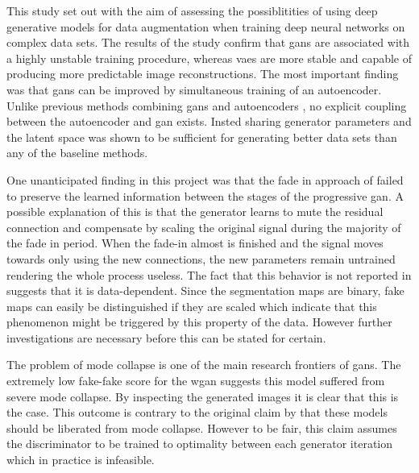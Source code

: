 This study set out with the aim of assessing the possiblitities of using deep generative models for data augmentation when training deep neural networks on complex data sets. The results of the study confirm that \acrshort{gans} are associated with a highly unstable training procedure, whereas \acrshort{vaes} are more stable and capable of producing more predictable image reconstructions. The most important finding was that \acrshort{gans} can be improved by simultaneous training of an autoencoder. Unlike previous methods combining \acrshort{gans} and autoencoders \parencite{LarsenSW15autoencodingbeyond, nguyen2016plug, donahue2016adversarial, ulyanovVL17adversarial}, no explicit coupling between the autoencoder and \acrshort{gan} exists. Insted sharing generator parameters and the latent space was shown to be sufficient for generating better data sets than any of the baseline methods.

One unanticipated finding in this project was that the fade in approach of \textcite{karras2017progressive} failed to preserve the learned information between the stages of the progressive \acrshort{gan}. A possible explanation of this is that the generator learns to mute the residual connection and compensate by scaling the original signal during the majority of the fade in period. When the fade-in almost is finished and the signal moves towards only using the new connections, the new parameters remain untrained rendering the whole process useless. The fact that this behavior is not reported in \parencite{karras2017progressive} suggests that it is data-dependent. Since the segmentation maps are binary, fake maps can easily be distinguished if they are scaled which indicate that this phenomenon might be triggered by this property of the data. However further investigations are necessary before this can be stated for certain.

The problem of mode collapse is one of the main research frontiers of \acrshort{gans}. The extremely low fake-fake score for the \acrlong{wgan} suggests this model suffered from severe mode collapse. By inspecting the generated images it is clear that this is the case. This outcome is contrary to the original claim by \textcite{arjovsky2017wasserstein} that these models should be liberated from mode collapse. However to be fair, this claim assumes the discriminator to be trained to optimality between each generator iteration which in practice is infeasible. 

